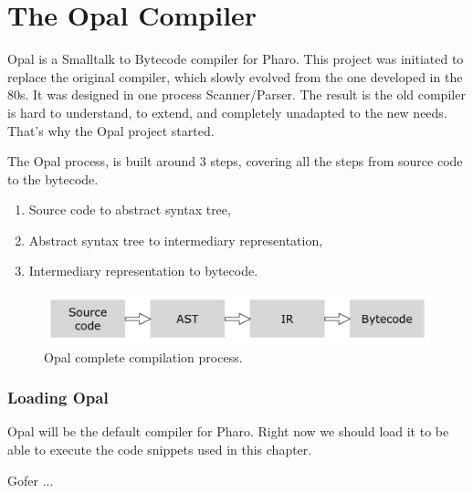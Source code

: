 \documentclass[a4paper,10pt,twoside]{book}
\begin{document}
	\sloppy
\fi


\newcommand{\opal}[0]{Opal\xspace} %
\chapter{The Opal Compiler} 


\opal is a Smalltalk to Bytecode compiler for Pharo. This project was initiated to replace the original compiler, which slowly evolved from the one developed in the 80s. It was designed in one process Scanner/Parser. The result is the old compiler is hard to understand, to extend, and completely unadapted to the new needs. That's why the \opal project started. 

The \opal process, is built around 3 steps, covering all the steps from source code to the bytecode.

\begin{enumerate}
\item Source code to abstract syntax tree,
\item Abstract syntax tree to intermediary representation,
\item Intermediary representation to bytecode.
\end{enumerate}

\begin{figure}[ht]\centering
	\includegraphics[width=\linewidth]{fullProcess}
	\caption{\opal complete compilation process. }
\end{figure}


\subsection{Loading Opal}

\opal will be the default compiler for Pharo. Right now we should load it to be able to execute the code snippets used in this chapter.

\begin{code}{}
Gofer
	...
	

\end{code}
\end{document}

